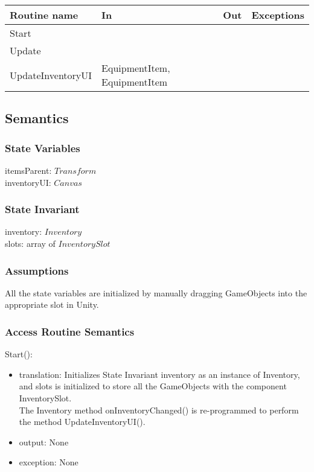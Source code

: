\documentclass[12pt]{article}
\begin{document}
\begin{tabular}{| l | l | l | l |}
\hline
\textbf{Routine name} & \textbf{In} & \textbf{Out} & \textbf{Exceptions}\\
\hline
Start & ~ & ~  & ~\\
Update & ~ & ~ & ~\\
UpdateInventoryUI & EquipmentItem, EquipmentItem & ~ & ~\\
\hline
\end{tabular}

\subsection* {Semantics}

\subsubsection* {State Variables}

itemsParent: $Transform$\\
inventoryUI: $Canvas$\\

\subsubsection* {State Invariant}

inventory: $Inventory$\\
slots: array of $InventorySlot$

\subsubsection* {Assumptions}

All the state variables are initialized by manually dragging GameObjects into the appropriate slot in Unity.

\subsubsection* {Access Routine Semantics}

\noindent Start():
\begin{itemize}
\item translation: Initializes State Invariant inventory as an instance of Inventory, and slots is initialized to store all the GameObjects with the component InventorySlot.\\
The Inventory method onInventoryChanged() is re-programmed to perform the method UpdateInventoryUI().
\item output: None
\item exception: None
\end{itemize}
\end{document}
